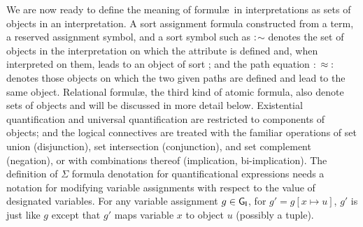 \documentclass[output=paper
                ,modfonts
                ,nonflat
	        ,collection
	        ,collectionchapter
	        ,collectiontoclongg
 	        ,biblatex
                ,babelshorthands
                ,newtxmath
                ,draftmode
                ,colorlinks, citecolor=brown
]{./langsci/langscibook}
\begin{document}
{{We are now ready to define the meaning of formul\ae\ in
interpretations as sets of objects in an interpretation. A
sort assignment formula constructed from a term, a reserved assignment
symbol, and a sort symbol such as
$\operatorname{:}$$\sim$ denotes the set
of objects in the interpretation on which the  attribute
is defined and, when interpreted on them, leads to an object of sort
; and the path equation $\operatorname{:}$ $\approx\operatorname{:}$ denotes those objects on which the two given paths are
defined and lead to the same object. Relational formul\ae, the
third kind of atomic formula, also denote sets of objects and will
be discussed in more detail below. Existential quantification and universal
quantification are restricted to components of objects; and the logical
connectives are treated with the familiar operations of set union
(disjunction), set intersection (conjunction), and set complement (negation),
or with combinations thereof (implication, bi-implication).
The definition of $\Sigma$ formula denotation for quantificational
expressions needs a
notation for modifying variable assignments with respect to the
value of designated variables. For any variable assignment $g\in\mathsf{G}_{\mathsf{I}}$,
for $g'=g[x \mapsto u]$, $g'$ is just like $g$ except that
$g'$ maps variable $x$ to object $u$ (possibly a tuple).


}}
\end{document}
